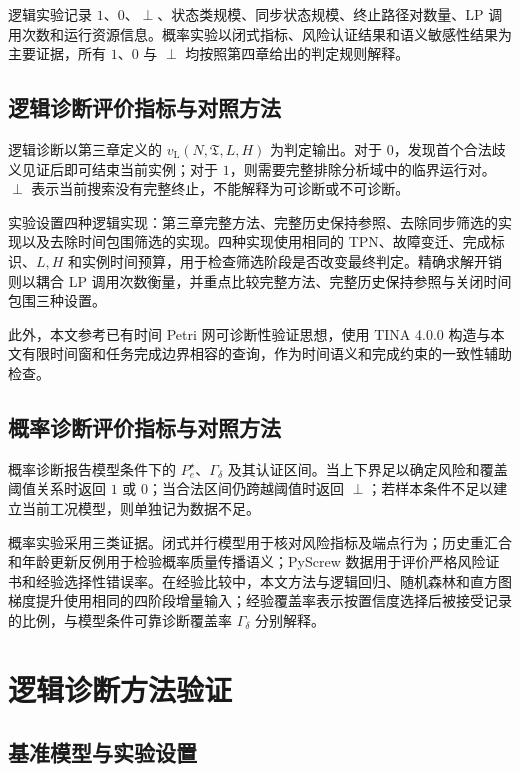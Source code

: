 \documentclass[master,fontset=ubuntu]{shnuthesis}
\DeclareRobustCommand{\logicstatus}[1]{\ensuremath{#1}}
\DeclareRobustCommand{\probstatus}[1]{\ensuremath{#1}}
\theoremstyle{definition}
\begin{document}
逻辑实验记录 \logicstatus{1}、\logicstatus{0}、\logicstatus{\perp}、状态类规模、同步状态规模、终止路径对数量、LP 调用次数和运行资源信息。概率实验以闭式指标、风险认证结果和语义敏感性结果为主要证据，所有 \probstatus{1}、\probstatus{0} 与 \probstatus{\perp} 均按照第四章给出的判定规则解释。

\subsection{逻辑诊断评价指标与对照方法}

逻辑诊断以第三章定义的 \(v_{\mathrm L}(N,\mathfrak T,L,H)\) 为判定输出。对于 \logicstatus{0}，发现首个合法歧义见证后即可结束当前实例；对于 \logicstatus{1}，则需要完整排除分析域中的临界运行对。\logicstatus{\perp} 表示当前搜索没有完整终止，不能解释为可诊断或不可诊断。

实验设置四种逻辑实现：第三章完整方法、完整历史保持参照、去除同步筛选的实现以及去除时间包围筛选的实现。四种实现使用相同的 TPN、故障变迁、完成标识、\(L,H\) 和实例时间预算，用于检查筛选阶段是否改变最终判定。精确求解开销则以耦合 LP 调用次数衡量，并重点比较完整方法、完整历史保持参照与关闭时间包围三种设置。

此外，本文参考已有时间 Petri 网可诊断性验证思想\cite{Pencole2022}，使用 TINA 4.0.0 构造与本文有限时间窗和任务完成边界相容的查询，作为时间语义和完成约束的一致性辅助检查。

\subsection{概率诊断评价指标与对照方法}

概率诊断报告模型条件下的 \(P_e^\star\)、\(\Gamma_\delta\) 及其认证区间。当上下界足以确定风险和覆盖阈值关系时返回 \probstatus{1} 或 \probstatus{0}；当合法区间仍跨越阈值时返回 \probstatus{\perp}；若样本条件不足以建立当前工况模型，则单独记为数据不足。

概率实验采用三类证据。闭式并行模型用于核对风险指标及端点行为；历史重汇合和年龄更新反例用于检验概率质量传播语义；PyScrew 数据用于评价严格风险证书和经验选择性错误率。在经验比较中，本文方法与逻辑回归、随机森林和直方图梯度提升使用相同的四阶段增量输入；经验覆盖率表示按置信度选择后被接受记录的比例，与模型条件可靠诊断覆盖率 \(\Gamma_\delta\) 分别解释。

\section{逻辑诊断方法验证}

\subsection{基准模型与实验设置}
\end{document}
